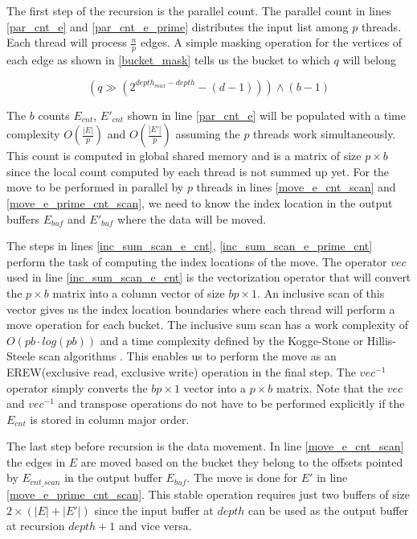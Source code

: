 \documentclass[conference]{IEEEtran}
\begin{document}
The first step of the recursion is the parallel count. The parallel count in lines \ref{par_cnt_e} and \ref{par_cnt_e_prime} distributes the input list among $p$ threads. Each thread will process $\frac{n}{p}$ edges. A simple masking operation for the vertices of each edge as shown in \ref{bucket_mask} tells us the bucket to which $q$ will belong

\begin{equation}
(q \gg (2^{depth_{max}-depth}-(d-1)))\land(b-1) \label{bucket_mask}
\end{equation}

The $b$ counts $E_{cnt}$, $E'_{cnt}$  shown in line \ref{par_cnt_e} will be populated with a time complexity $O(\frac{|E|}{p})$ and $O(\frac{|E'|}{p})$ assuming the $p$ threads work simultaneously. This count is computed in global shared memory and is a matrix of size $p \times b$ since the local count computed by each thread is not summed up yet. For the move to be performed in parallel by $p$ threads in lines \ref{move_e_cnt_scan} and \ref{move_e_prime_cnt_scan}, we need to know the index location in the output buffers $E_{buf}$ and $E'_{buf}$ where the data will be moved.

The steps in lines \ref{inc_sum_scan_e_cnt}, \ref{inc_sum_scan_e_prime_cnt} perform the task of computing the index locations of the move. The operator $vec$ used in line \ref{inc_sum_scan_e_cnt} is the vectorization operator\cite{b20} that will convert the $p \times b$ matrix into a column vector of size $bp \times 1$. An inclusive scan of this vector gives us the index location boundaries where each thread will perform a move operation for each bucket. The inclusive sum scan has a work complexity of $O(pb\cdot log(pb))$ and a time complexity defined by the Kogge-Stone or Hillis-Steele scan algorithms \cite{b14}. This enables us to perform the move as an EREW(exclusive read, exclusive write) operation in the final step. The $vec^{-1}$ operator simply converts the $bp \times 1$ vector into a $p \times b$ matrix. Note that the $vec$ and $vec^{-1}$ and transpose operations do not have to be performed explicitly if the $E_{cnt}$ is stored in column major order.

The last step before recursion is the data movement. In line \ref{move_e_cnt_scan} the edges in $E$ are moved based on the bucket they belong to the offsets pointed by $E_{cnt\_scan}$ in the output buffer $E_{buf}$. The move is done for $E'$ in line \ref{move_e_prime_cnt_scan}. This stable operation requires just two buffers of size $2\times (|E|+|E'|)$ since the input buffer at $depth$ can be used as the output buffer at recursion $depth+1$ and vice versa.
\end{document}
